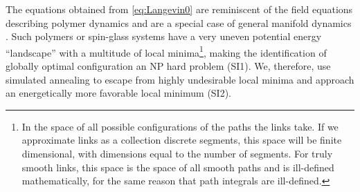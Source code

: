 \documentclass[nofootinbib,preprint,floatfix,titlepage,endfloats]{revtex4} %
\begin{document}
The equations obtained from \eqref{eq:Langevin0} are reminiscent of the field equations describing polymer dynamics and are a special case of general manifold dynamics \cite{mezard1991replica}. Such polymers or spin-glass systems have a very uneven potential energy ``landscape'' \cite{parisi2002physical} with a multitude of local minima\footnote{In the space of all possible configurations of the paths the links take.
If we approximate links as a collection discrete segments, this space will be finite dimensional, with dimensions equal to the number of segments. 
For truly smooth links, this space is the space of all smooth paths and is ill-defined mathematically, for the same reason that path integrals are ill-defined.}, making the identification of globally optimal configuration %
 an NP hard problem (SI1).
We, therefore, use simulated annealing \cite{hwang1988simulated} to escape from highly undesirable local minima and approach an energetically more favorable local minimum (SI2). 

\end{document}

